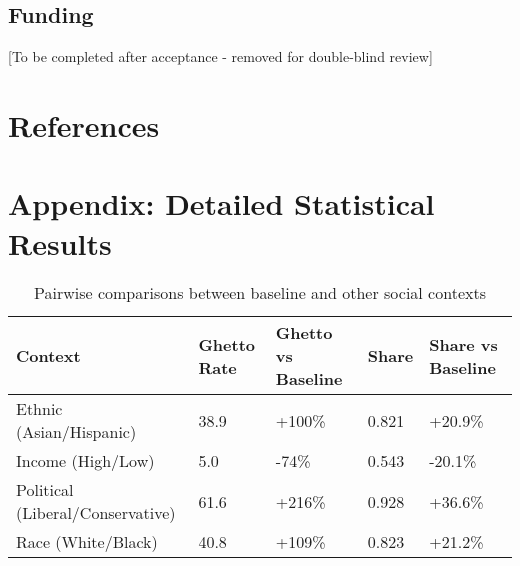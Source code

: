 \documentclass[pdflatex,sn-basic]{sn-jnl}%
\begin{document}
\subsection*{Funding}
[To be completed after acceptance - removed for double-blind review]

\section*{References}


\section*{Appendix: Detailed Statistical
Results}\label{appendix-detailed-statistical-results}


\begin{table}[ht]
\caption{Pairwise comparisons between baseline and other social contexts}
\centering
\begin{tabular}{lllll}
\hline
Context & Ghetto Rate & Ghetto vs Baseline & Share & Share vs Baseline\\
\hline
Ethnic (Asian/Hispanic) & 38.9 & +100\% & 0.821 & +20.9\%\\
Income (High/Low) & 5.0 & -74\% & 0.543 & -20.1\%\\
Political (Liberal/Conservative) & 61.6 & +216\% & 0.928 & +36.6\%\\
Race (White/Black) & 40.8 & +109\% & 0.823 & +21.2\%\\
\hline
\end{tabular}
\end{table}
\end{document}

